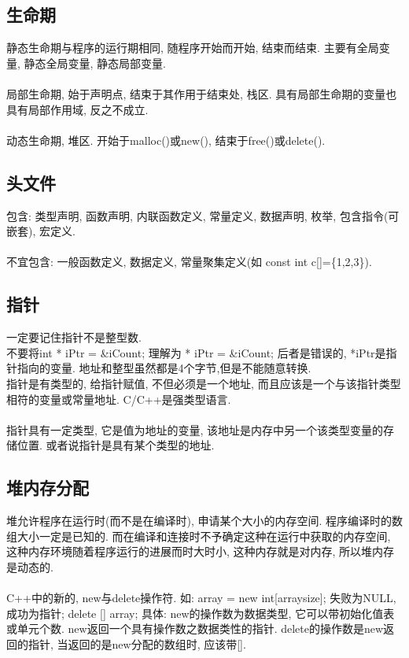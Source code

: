 \documentclass[a4paper,10pt,english]{article}
\begin{document}
\subsection {生命期}
静态生命期与程序的运行期相同, 随程序开始而开始, 结束而结束. 主要有全局变量, 静态全局变量, 静态局部变量.\\\\
局部生命期, 始于声明点, 结束于其作用于结束处, 栈区. 具有局部生命期的变量也具有局部作用域, 反之不成立. \\\\
动态生命期, 堆区. 开始于malloc()或new(), 结束于free()或delete().

\subsection {头文件}
包含: 类型声明, 函数声明, 内联函数定义, 常量定义, 数据声明, 枚举, 包含指令(可嵌套), 宏定义. \\\\
不宜包含: 一般函数定义, 数据定义, 常量聚集定义(如 const int c[]=\{1,2,3\}).

\subsection {指针}
一定要记住指针不是整型数. \\
不要将int * iPtr = \&iCount; 理解为 * iPtr = \&iCount; 后者是错误的, *iPtr是指针指向的变量. 地址和整型虽然都是4个字节,但是不能随意转换.\\
指针是有类型的, 给指针赋值, 不但必须是一个地址, 而且应该是一个与该指针类型相符的变量或常量地址. C/C++是强类型语言. \\\\
指针具有一定类型, 它是值为地址的变量, 该地址是内存中另一个该类型变量的存储位置. 或者说指针是具有某个类型的地址. \\

\subsection {堆内存分配}
堆允许程序在运行时(而不是在编译时), 申请某个大小的内存空间. 程序编译时的数组大小一定是已知的. 而在编译和连接时不予确定这种在运行中获取的内存空间, 这种内存环境随着程序运行的进展而时大时小, 这种内存就是对内存, 所以堆内存是动态的. \\\\
C++中的新的, new与delete操作符. 如: array = new int[arraysize]; 失败为NULL, 成功为指针; delete [] array; 具体: new的操作数为数据类型, 它可以带初始化值表或单元个数. new返回一个具有操作数之数据类性的指针. delete的操作数是new返回的指针, 当返回的是new分配的数组时, 应该带[].
\end{document}
